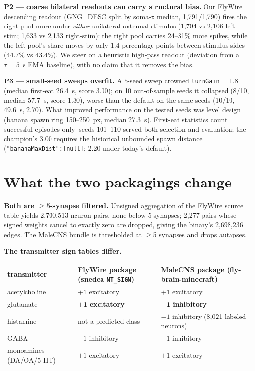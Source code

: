 \documentclass[11pt,a4paper]{article}
\begin{document}
\textbf{P2 --- coarse bilateral readouts can carry structural bias.} Our
FlyWire descending readout (GNG\_DESC split by soma-x median, 1,791/1,790)
fires the right pool more under \emph{either} unilateral antennal stimulus
(1,704 vs 2,106 left-stim; 1,633 vs 2,133 right-stim): the right pool
carries 24--31\% more spikes, while the left pool's share moves by only
1.4 percentage points between stimulus sides (44.7\% vs 43.4\%). We steer on a
heuristic high-pass readout (deviation from a $\tau = 5$~s EMA baseline),
with no claim that it removes the bias.

\textbf{P3 --- small-seed sweeps overfit.} A 5-seed sweep crowned
\texttt{turnGain} = 1.8 (median first-eat 26.4~s, score 3.00); on 10
out-of-sample seeds it collapsed (8/10, median 57.7~s, score 1.30), worse
than the default on the same seeds (10/10, 49.6~s, 2.70). What improved
performance on the tested seeds was level design (banana spawn ring
150--250~px, median 27.3~s). First-eat statistics count successful episodes
only; seeds 101--110 served both selection and evaluation; the champion's
3.00 requires the historical unbounded spawn distance
(\texttt{"bananaMaxDist":[null]}; 2.20 under today's default).

\section{What the two packagings change}

\textbf{Both are $\ge$5-synapse filtered.} Unsigned aggregation of the
FlyWire source table yields 2,700,513 neuron pairs, none below 5 synapses;
2,277 pairs whose signed weights cancel to exactly zero are dropped, giving
the binary's 2,698,236 edges. The MaleCNS bundle is thresholded at $\ge$5
synapses and drops autapses.

\textbf{The transmitter sign tables differ.}

\begin{center}
\footnotesize
\begin{tabular}{L{2.4cm} L{5.4cm} L{6.4cm}}
\toprule
transmitter & FlyWire package (snedea \texttt{NT\_SIGN}) & MaleCNS package (fly-brain-minecraft) \\
\midrule
acetylcholine & $+1$ excitatory & $+1$ excitatory \\
glutamate & $\mathbf{+1}$ \textbf{excitatory} & $\mathbf{-1}$ \textbf{inhibitory} \\
histamine & not a predicted class & $-1$ inhibitory (8,021 labeled neurons) \\
GABA & $-1$ inhibitory & $-1$ inhibitory \\
monoamines (DA/OA/5-HT) & $+1$ excitatory & $+1$ excitatory \\
\bottomrule
\end{tabular}
\end{center}
\end{document}
